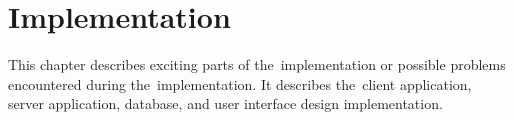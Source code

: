 \chapter{Implementation}
\label{chapter:implementation}

This chapter describes exciting parts of the~implementation or possible problems encountered during the~implementation.
It describes the~client application, server application, database, and user interface design implementation.





